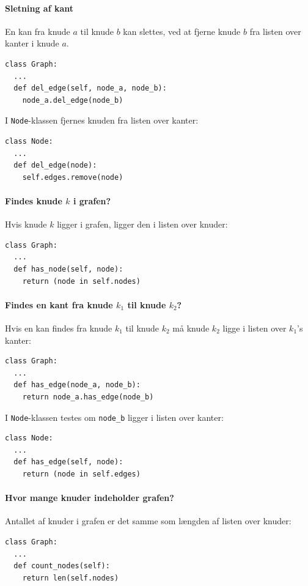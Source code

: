 \documentclass[10pt,a4paper,danish]{article}
\newcommand{\ct}{\texttt}
\begin{document}
\paragraph{Sletning af kant}
En kan fra knude $a$ til knude $b$ kan slettes, ved at fjerne knude
$b$ fra listen over kanter i knude $a$.

{\small
\begin{verbatim}
class Graph:
  ...
  def del_edge(self, node_a, node_b):
    node_a.del_edge(node_b)
\end{verbatim}}

I \ct{Node}-klassen fjernes knuden fra listen over kanter:
{\small
\begin{verbatim}
class Node:
  ...
  def del_edge(node):
    self.edges.remove(node)
\end{verbatim}}


\paragraph{Findes knude $k$ i grafen?}
Hvis knude $k$ ligger i grafen, ligger den i listen over knuder:

{\small
\begin{verbatim}
class Graph:
  ...
  def has_node(self, node):
    return (node in self.nodes)
\end{verbatim}}

\paragraph{Findes en kant fra knude $k_1$ til knude $k_2$?}
Hvis en kan findes fra knude $k_1$ til knude $k_2$ må knude $k_2$
ligge i listen over $k_1$'s kanter:
{\small
\begin{verbatim}
class Graph:
  ...
  def has_edge(node_a, node_b):
    return node_a.has_edge(node_b)
\end{verbatim}}

I \ct{Node}-klassen testes om \ct{node\_b} ligger i listen over kanter:
{\small
\begin{verbatim}
class Node:
  ...
  def has_edge(self, node):
    return (node in self.edges)
\end{verbatim}}

\paragraph{Hvor mange knuder indeholder grafen?}
Antallet af knuder i grafen er det samme som længden af listen over
knuder:
{\small
\begin{verbatim}
class Graph:
  ...
  def count_nodes(self):
    return len(self.nodes)
\end{verbatim}}
\end{document}
